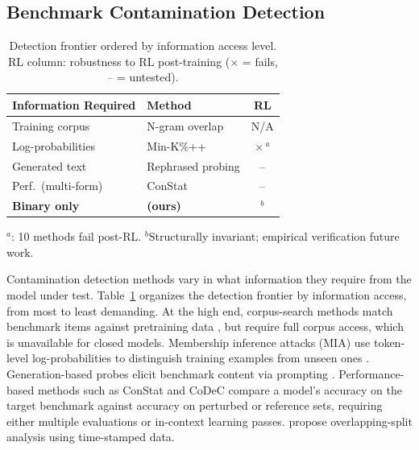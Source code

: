 \subsection{Benchmark Contamination Detection}\label{sec:contamination_related}

\begin{table}[t]
\centering
\small
\caption{Detection frontier ordered by information access level. RL column: robustness to RL post-training ($\times$ = fails, -- = untested).}
\label{tab:frontier}
\begin{tabular}{@{}llc@{}}
\toprule
Information Required & Method & RL \\
\midrule
Training corpus & N-gram overlap \citep{dodge2021} & N/A \\
Log-probabilities & Min-K\%++ \citep{minkprob2024} & $\times$\,$^{a}$ \\
Generated text & Rephrased probing \citep{golchin2024} & -- \\
Perf.\ (multi-form) & ConStat \citep{constat2024} & -- \\
\textbf{Binary only} & \textbf{\irtfit{} (ours)} & $^{b}$ \\
\bottomrule
\end{tabular}

{\raggedright\scriptsize $^{a}$\citet{wang2025fragility}: 10 methods fail post-RL.
$^{b}$Structurally invariant; empirical verification future work.\par}
\end{table}

Contamination detection methods vary in what information they require from the model under test.
Table~\ref{tab:frontier} organizes the detection frontier by information access, from most to least demanding.
At the high end, corpus-search methods match benchmark items against pretraining data \citep{dodge2021, magar2022}, but require full corpus access, which is unavailable for closed models.
Membership inference attacks (MIA) use token-level log-probabilities to distinguish training examples from unseen ones \citep{minkprob2024, deng2024}.
Generation-based probes elicit benchmark content via prompting \citep{golchin2024, oren2024}.
Performance-based methods such as ConStat \citep{constat2024} and CoDeC \citep{codec2026} compare a model's accuracy on the target benchmark against accuracy on perturbed or reference sets, requiring either multiple evaluations or in-context learning passes.
\citet{sainz2023} propose overlapping-split analysis using time-stamped data.

